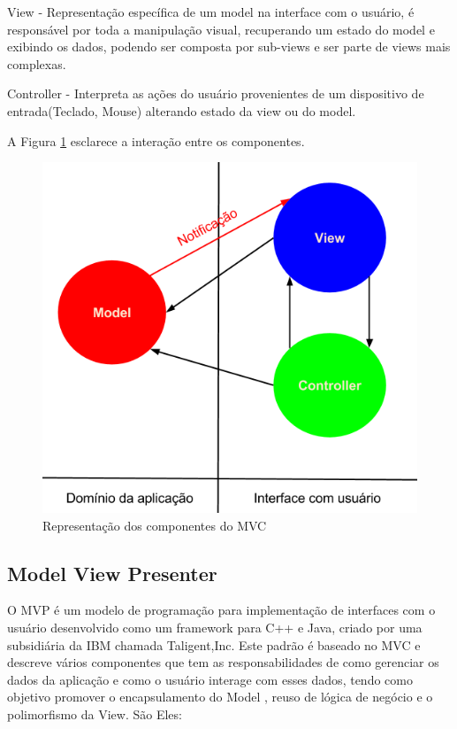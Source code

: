 \documentclass[conference]{IEEEtran}
\begin{document}
View - Representação específica de um model na interface com o usuário, é 
responsável por toda a manipulação visual, recuperando um estado do model e
exibindo os dados, podendo ser composta por sub-views e ser parte de views mais
complexas.

Controller - Interpreta as ações do usuário provenientes de um dispositivo de
entrada(Teclado, Mouse) alterando estado da view ou do model.
 
A Figura \ref{mvc} esclarece a interação entre os componentes.

\begin{figure}[htb]
	\begin{center}
		\includegraphics[scale=0.25]{img/mvc.png}
	\end{center}
	
	\caption{\label{mvc}Representação dos componentes do MVC}
\end{figure}


\subsection{Model View Presenter}

O MVP é um modelo de programação para implementação de interfaces com o usuário
desenvolvido como um framework para C++ e Java, criado por uma subsidiária da
IBM chamada Taligent,Inc. Este padrão é baseado no MVC e descreve vários
componentes que tem as responsabilidades de como gerenciar os dados da aplicação
e como o usuário interage com esses dados, tendo como objetivo promover o
encapsulamento do Model , reuso de lógica de negócio e o polimorfismo da View.
São Eles:
\end{document}
